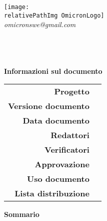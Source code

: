 \begin{titlepage} 

\begin{center}
\texttt{[image: \\relativePathImg OmicronLogo]} \\
\textit{omicronswe@gmail.com}\\[0.7cm]
\HRule \\[0.7cm] \textbf{\huge \doctitle}\\[0.4cm] \HRule \\[1.5cm] 
\par\end{center}{\huge \par}

\begin{center}
	\textbf{\Large Informazioni sul documento} \\[0.5cm]
	\begin{longtable}{ r | p{5cm} }
		\textbf{Progetto} & \nameproject \\
		\textbf{Versione documento} & \versiondoc \\
		\textbf{Data documento} & \datared \\
		\textbf{Redattori} & \parbox[t]{\textwidth}{\redattore} \\
		\textbf{Verificatori} & \parbox[t]{\textwidth}{\verificatori} \\
		\textbf{Approvazione} & \approvazione \\
		\textbf{Uso documento} & \usodoc \\
		\textbf{Lista distribuzione} & \parbox[t]{\textwidth}{\listadistr} \\
	\end{longtable}
\vspace{0.7cm}
\textbf{\Large Sommario} \\[0.4cm]
\testosommario
\end{center}%

\end{titlepage} 

